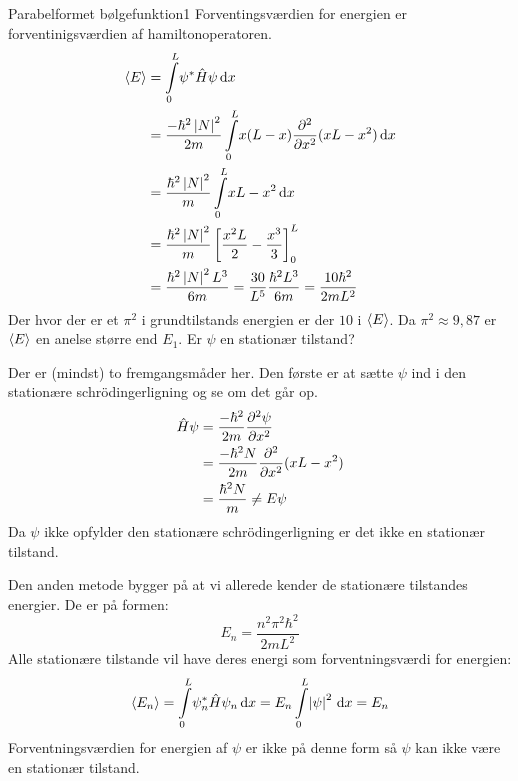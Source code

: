 \begin{opgave}{Parabelformet bølgefunktion}{1}
Forventingsværdien for energien er forventinigsværdien af hamiltonoperatoren.
\begin{align*}
    \expect E &= \integral{\psi^*\op H \psi}{x}{0}{L}\\
    &= \frac{-\hbar^2\abs N^2}{2m}\integral{x(L-x)\pdif[2]{x}{}(xL-x^2)}{x}{0}{L}\\
    &= \frac{\hbar^2\abs N^2}{m}\integral{xL-x^2}{x}{0}{L}\\
    &= \frac{\hbar^2\abs N^2}{m}\left[\frac{x^2L}{2}-\frac{x^3}{3}\right]_0^L\\
    &= \frac{\hbar^2\abs N^2L^3}{6m} = \frac{30}{L^5}\frac{\hbar^2L^3}{6m} = \frac{10\hbar^2}{2mL^2}
\end{align*}
Der hvor der er et $\pi^2$ i grundtilstands energien er der $10$ i $\expect E$. Da $\pi^2\approx 9,87$ er $\expect E$ en anelse større end $E_1$.
\opg Er $\psi$ en stationær tilstand?

Der er (mindst) to fremgangsmåder her. Den første er at sætte $\psi$ ind i den stationære schrödingerligning og se om det går op.
\begin{align*}
    \op H\psi &= \frac{-\hbar^2}{2m}\pdif[2]{x}\psi\\
    &= \frac{-\hbar^2 N}{2m}\pdif[2]{x}{}(xL-x^2)\\
    &= \frac{\hbar^2 N}{m}\neq E\psi
\end{align*}
Da $\psi$ ikke opfylder den stationære schrödingerligning er det ikke en stationær tilstand.

Den anden metode bygger på at vi allerede kender de stationære tilstandes energier. De er på formen:
$$
E_n = \frac{n^2\pi^2\hbar^2}{2mL^2}
$$
Alle stationære tilstande vil have deres energi som forventningsværdi for energien:
$$
\expect{E_n} = \integral{\psi_n^*\op H \psi_n}{x}{0}{L} = E_n\integral{\abs \psi^2}{x}{0}{L} = E_n
$$
Forventningsværdien for energien af $\psi$ er ikke på denne form så $\psi$ kan ikke være en stationær tilstand.
\end{opgave}

